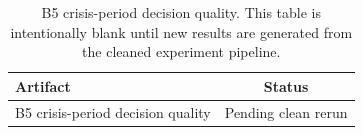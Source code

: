 \begin{table}[!t]
\centering
\footnotesize
\begin{tabular}{@{}lc@{}}
\toprule
Artifact & Status \\
\midrule
B5 crisis-period decision quality & Pending clean rerun \\
\bottomrule
\end{tabular}
\caption{B5 crisis-period decision quality. This table is intentionally blank until new results are generated from the cleaned experiment pipeline.}
\label{tab:b5_crisis}
\end{table}
